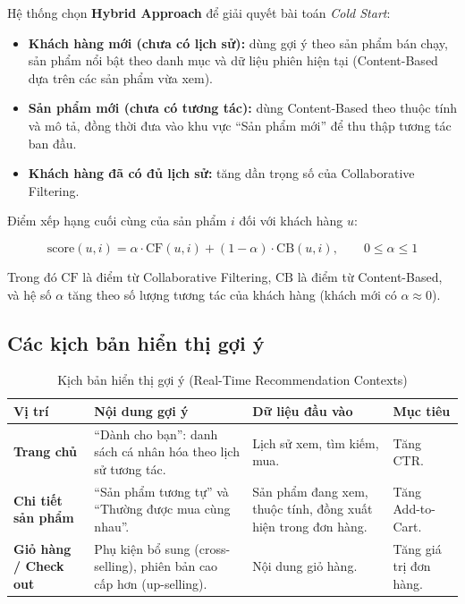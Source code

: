 \documentclass[12pt,a4paper,oneside]{report}
\begin{document}
Hệ thống chọn \textbf{Hybrid Approach} để giải quyết bài toán \emph{Cold Start}:

\begin{itemize}
  \item \textbf{Khách hàng mới (chưa có lịch sử):} dùng gợi ý theo sản phẩm bán chạy, sản phẩm nổi bật theo danh mục và dữ liệu phiên hiện tại (Content-Based dựa trên các sản phẩm vừa xem).
  \item \textbf{Sản phẩm mới (chưa có tương tác):} dùng Content-Based theo thuộc tính và mô tả, đồng thời đưa vào khu vực ``Sản phẩm mới'' để thu thập tương tác ban đầu.
  \item \textbf{Khách hàng đã có đủ lịch sử:} tăng dần trọng số của Collaborative Filtering.
\end{itemize}

Điểm xếp hạng cuối cùng của sản phẩm $i$ đối với khách hàng $u$:

\begin{equation}
\text{score}(u,i) = \alpha \cdot \text{CF}(u,i) + (1-\alpha) \cdot \text{CB}(u,i), \qquad 0 \le \alpha \le 1
\end{equation}

Trong đó $\text{CF}$ là điểm từ Collaborative Filtering, $\text{CB}$ là điểm từ Content-Based, và hệ số $\alpha$ tăng theo số lượng tương tác của khách hàng (khách mới có $\alpha \approx 0$).

\subsection{Các kịch bản hiển thị gợi ý}

\begin{longtable}{p{3.4cm}p{5.4cm}p{3.6cm}p{3.4cm}}
\caption{Kịch bản hiển thị gợi ý (Real-Time Recommendation Contexts)}\\
\toprule
\textbf{Vị trí} & \textbf{Nội dung gợi ý} & \textbf{Dữ liệu đầu vào} & \textbf{Mục tiêu} \\
\midrule
\endhead
\bottomrule
\endlastfoot
\textbf{Trang chủ} & ``Dành cho bạn'': danh sách cá nhân hóa theo lịch sử tương tác. & Lịch sử xem, tìm kiếm, mua. & Tăng CTR. \\
\textbf{Chi tiết sản phẩm} & ``Sản phẩm tương tự'' và ``Thường được mua cùng nhau''. & Sản phẩm đang xem, thuộc tính, đồng xuất hiện trong đơn hàng. & Tăng Add-to-Cart. \\
\textbf{Giỏ hàng / Check out} & Phụ kiện bổ sung (cross-selling), phiên bản cao cấp hơn (up-selling). & Nội dung giỏ hàng. & Tăng giá trị đơn hàng. \\
\end{longtable}
\end{document}

